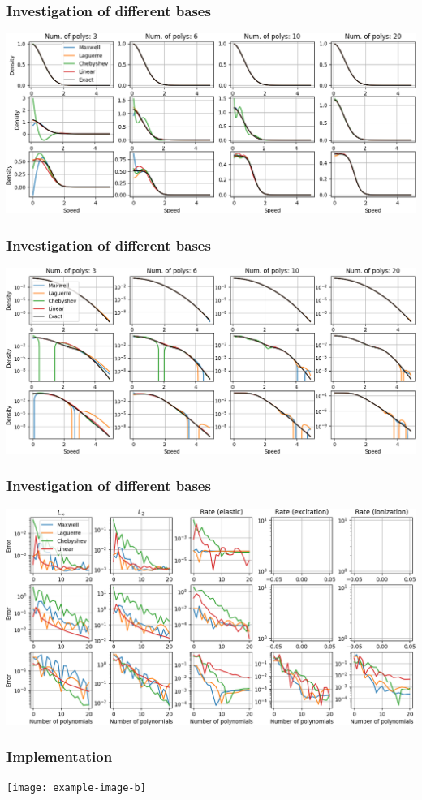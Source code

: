 \documentclass[mathserif, aspectratio=169]{beamer}
\begin{document}
\begin{frame}
\frametitle{Investigation of different bases}
%
\begin{center}
   \includegraphics[height=2.in]{figures/bolsig_visual_lin.png}
\end{center}
%
\end{frame}

\begin{frame}
\frametitle{Investigation of different bases}
%
\begin{center}
   \includegraphics[height=2.in]{figures/bolsig_visual.png}
\end{center}
%
\end{frame}

\begin{frame}
\frametitle{Investigation of different bases}
%
\begin{center}
   \includegraphics[height=2.in]{figures/bolsig_convergence.png}
\end{center}
%
\end{frame}



\begin{frame}
\frametitle{Implementation}
%
\begin{center}
   \texttt{[image: example-image-b]}
\end{center}
%
\end{frame}


\end{document}
